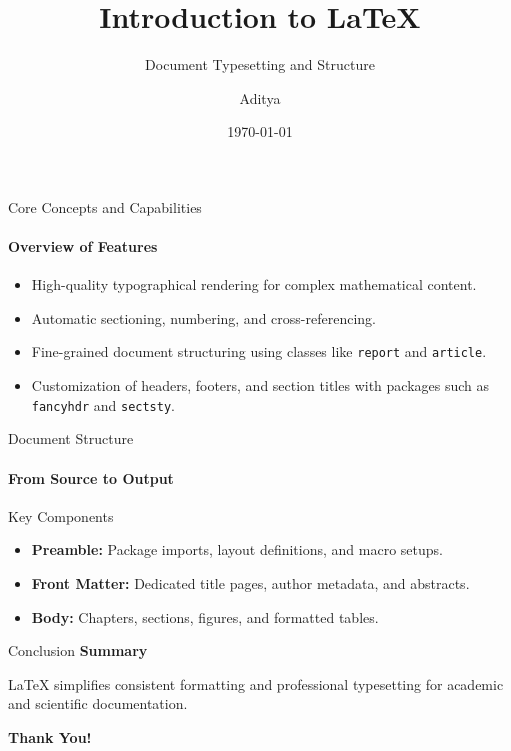\documentclass{beamer}
\title[Introduction to \LaTeX]{Introduction to \LaTeX}
\subtitle{Document Typesetting and Structure}
\author{Aditya}
\date{\today}
\begin{document}
\begin{frame}
    \titlepage
\end{frame}

\begin{frame}{Core Concepts and Capabilities}
    \framesubtitle{Overview of Features}
    \begin{itemize}
        \item High-quality typographical rendering for complex mathematical content.
        \item Automatic sectioning, numbering, and cross-referencing.
        \item Fine-grained document structuring using classes like \texttt{report} and \texttt{article}.
        \item Customization of headers, footers, and section titles with packages such as \texttt{fancyhdr} and \texttt{sectsty}.
    \end{itemize}
\end{frame}

\begin{frame}{Document Structure}
    \framesubtitle{From Source to Output}
    \begin{block}{Key Components}
        \begin{itemize}
            \item \textbf{Preamble:} Package imports, layout definitions, and macro setups.
            \item \textbf{Front Matter:} Dedicated title pages, author metadata, and abstracts.
            \item \textbf{Body:} Chapters, sections, figures, and formatted tables.
        \end{itemize}
    \end{block}
\end{frame}

\begin{frame}{Conclusion}
    \centering
    \Large \textbf{Summary}
    
    \vspace{0.8cm}
    \normalsize
    \LaTeX{} simplifies consistent formatting and professional typesetting for academic and scientific documentation.

    \vspace{1.2cm}
    \textbf{Thank You!}
\end{frame}
\end{document}
